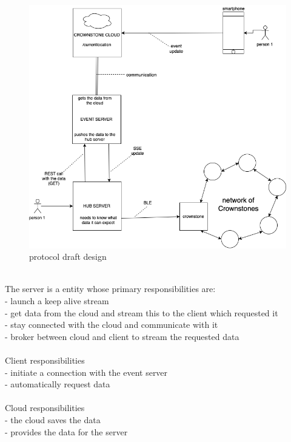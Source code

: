 \documentclass{article}
\begin{document}
\label{fig:protocolDraft}	
	\begin{figure}[H]
	\includegraphics[width=5in]{pictures/prototypeV2.png}
	\caption[Optional caption]{protocol draft design}
	\end{figure}
\\
The server is a entity whose primary responsibilities are: \\
- launch a keep alive stream\\
- get data from the cloud and stream this to the client which requested it\\
- stay connected with the cloud and communicate with it \\
- broker between cloud and client to stream the requested data\\
\\
Client responsibilities  \\
- initiate a connection with the event server\\
- automatically request data\\
\\
Cloud responsibilities  \\
-  the cloud saves the data\\
- provides the data for the server\\ 

\end{document}
